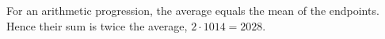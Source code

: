 For an arithmetic progression, the average equals the mean of the endpoints. Hence their sum is twice the average, $ 2\cdot1014=\boxed{2028}$.
